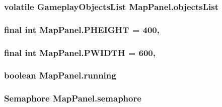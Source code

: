 \hypertarget{classMapPanel_a636653ac7ebbff9faf60f89bfb3887ab}{
\subsubsection[{objects\-List}]{\setlength{\rightskip}{0pt plus 5cm}volatile {\bf Gameplay\-Objects\-List} Map\-Panel.\-objects\-List\hspace{0.3cm}{\ttfamily [private]}}}\label{classMapPanel_a636653ac7ebbff9faf60f89bfb3887ab}
\hypertarget{classMapPanel_ab568855b8c5789ced1e76c48046c1775}{
\subsubsection[{P\-H\-E\-I\-G\-H\-T}]{\setlength{\rightskip}{0pt plus 5cm}final int Map\-Panel.\-P\-H\-E\-I\-G\-H\-T = 400\hspace{0.3cm}{\ttfamily [static]}, {\ttfamily [private]}}}\label{classMapPanel_ab568855b8c5789ced1e76c48046c1775}
\hypertarget{classMapPanel_a78dbdc3c4f055e777934bf965835ecdc}{
\subsubsection[{P\-W\-I\-D\-T\-H}]{\setlength{\rightskip}{0pt plus 5cm}final int Map\-Panel.\-P\-W\-I\-D\-T\-H = 600\hspace{0.3cm}{\ttfamily [static]}, {\ttfamily [private]}}}\label{classMapPanel_a78dbdc3c4f055e777934bf965835ecdc}
\hypertarget{classMapPanel_a2af536efa9e8a4df2d0bef98b427a878}{
\subsubsection[{running}]{\setlength{\rightskip}{0pt plus 5cm}boolean Map\-Panel.\-running\hspace{0.3cm}{\ttfamily [private]}}}\label{classMapPanel_a2af536efa9e8a4df2d0bef98b427a878}
\hypertarget{classMapPanel_a94fbd1f030f19c4f0841defc21fe81b2}{
\subsubsection[{semaphore}]{\setlength{\rightskip}{0pt plus 5cm}Semaphore Map\-Panel.\-semaphore\hspace{0.3cm}{\ttfamily [private]}}}\label{classMapPanel_a94fbd1f030f19c4f0841defc21fe81b2}
